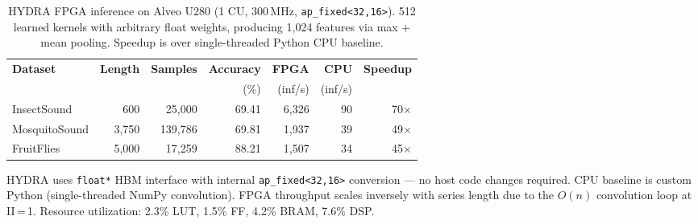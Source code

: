 
\begin{table}[t]
\centering
\caption{HYDRA FPGA inference on Alveo U280 (1 CU, 300\,MHz, \texttt{ap\_fixed<32,16>}).
512 learned kernels with arbitrary float weights, producing 1{,}024 features
via max + mean pooling. Speedup is over single-threaded Python CPU baseline.}
\label{tab:hydra}
\begin{tabular}{l r r r r r r}
\toprule
\textbf{Dataset} & \textbf{Length} & \textbf{Samples} & \textbf{Accuracy} & \textbf{FPGA} & \textbf{CPU} & \textbf{Speedup} \\
 & & & (\%) & (inf/s) & (inf/s) & \\
\midrule
InsectSound   & 600   & 25{,}000  & 69.41 & 6{,}326 & 90  & 70$\times$ \\
MosquitoSound & 3{,}750 & 139{,}786 & 69.81 & 1{,}937 & 39  & 49$\times$ \\
FruitFlies    & 5{,}000 & 17{,}259  & 88.21 & 1{,}507 & 34  & 45$\times$ \\
\bottomrule
\end{tabular}

\vspace{0.3em}
\footnotesize
HYDRA uses \texttt{float*} HBM interface with internal \texttt{ap\_fixed<32,16>}
conversion --- no host code changes required. CPU baseline is custom Python
(single-threaded NumPy convolution). FPGA throughput scales inversely with
series length due to the $O(n)$ convolution loop at II\,=\,1.
Resource utilization: 2.3\% LUT, 1.5\% FF, 4.2\% BRAM, 7.6\% DSP.
\end{table}

